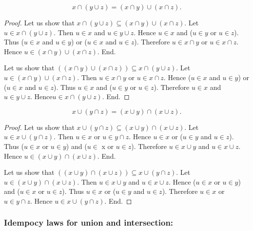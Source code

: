 \documentclass[../../set-theory.ftl.tex]{subfiles}
\begin{document}
  \begin{forthel}
    \begin{proposition}\label{SetTheory_01_01_106755}
      \[ x \cap (y \cup z) = (x \cap y) \cup (x \cap z). \]
    \end{proposition}
    \begin{proof}
      Let us show that $x \cap (y \cup z) \subseteq (x \cap y) \cup (x \cap z)$.
        Let $u \in x \cap (y \cup z)$.
        Then $u \in x$ and $u \in y \cup z$.
        Hence $u \in x$ and ($u \in y$ or $u \in z$).
        Thus ($u \in x$ and $u \in y$) or ($u \in x$ and $u \in z$).
        Therefore $u \in x \cap y$ or $u \in x \cap z$.
        Hence $u \in (x \cap y) \cup (x \cap z)$.
      End.

      Let us show that $((x \cap y) \cup (x \cap z)) \subseteq x \cap (y \cup z)$.
        Let $u \in (x \cap y) \cup (x \cap z)$.
        Then $u \in x \cap y$ or $u \in x \cap z$.
        Hence ($u \in x$ and $u \in y$) or ($u \in x$ and $u \in z$).
        Thus $u \in x$ and ($u \in y$ or $u \in z$).
        Therefore $u \in x$ and $u \in y \cup z$.
        Hence$ u \in x \cap (y \cup z)$.
      End.
    \end{proof}

    \begin{proposition}\label{SetTheory_01_01_836290}
      \[ x \cup (y \cap z) = (x \cup y) \cap (x \cup z). \]
    \end{proposition}
    \begin{proof}
      Let us show that $x \cup (y \cap z) \subseteq (x \cup y) \cap (x \cup z)$.
        Let $u \in x \cup (y \cap z)$.
        Then $u \in x$ or $u \in y \cap z$.
        Hence $u \in x$ or ($u \in y$ and $u \in z$).
        Thus ($u \in x$ or $u \in y$) and ($u \in$ x or $u \in z$).
        Therefore $u \in x \cup y$ and $u \in x \cup z$.
        Hence $u \in (x \cup y) \cap (x \cup z)$.
      End.

      Let us show that $((x \cup y) \cap (x \cup z)) \subseteq x \cup (y \cap z)$.
        Let $u \in (x \cup y) \cap (x \cup z)$.
        Then $u \in x \cup y$ and $u \in x \cup z$.
        Hence ($u \in x$ or $u \in y$) and ($u \in x$ or $u \in z$).
        Thus $u \in x$ or ($u \in y$ and $u \in z$).
        Therefore $u \in x$ or $u \in y \cap z$.
        Hence $u \in x \cup (y \cap z)$.
      End.
    \end{proof}
  \end{forthel}


  \subsubsection*{Idempocy laws for union and intersection:}
\end{document}

